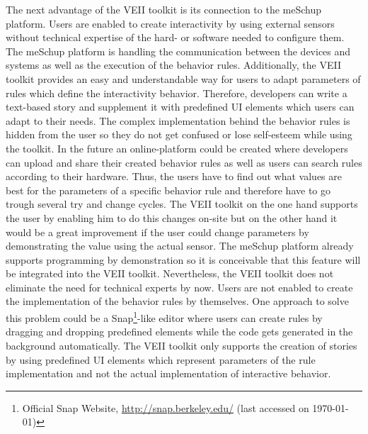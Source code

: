 The next advantage of the VEII toolkit is its connection to the meSchup platform. Users are enabled to create interactivity by using external sensors without technical expertise of the hard- or software needed to configure them. The meSchup platform is handling the communication between the devices and systems as well as the execution of the behavior rules. Additionally, the VEII toolkit provides an easy and understandable way for users to adapt parameters of rules which define the interactivity behavior. Therefore, developers can write a text-based story and supplement it with predefined UI elements which users can adapt to their needs. The complex implementation behind the behavior rules is hidden from the user so they do not get confused or lose self-esteem while using the toolkit. In the future an online-platform could be created where developers can upload and share their created behavior rules as well as users can search rules according to their hardware. Thus, the users have to find out what values are best for the parameters of a specific behavior rule and therefore have to go trough several try and change cycles. The VEII toolkit on the one hand supports the user by enabling him to do this changes on-site but on the other hand it would be a great improvement if the user could change parameters by demonstrating the value using the actual sensor. The meSchup platform already supports programming by demonstration so it is conceivable that this feature will be integrated into the VEII toolkit. Nevertheless, the VEII toolkit does not eliminate the need for technical experts by now. Users are not enabled to create the implementation of the behavior rules by themselves. One approach to solve this problem could be a Snap\footnote{Official Snap Website, \url{http://snap.berkeley.edu/} (last accessed on \today)}-like editor where users can create rules by dragging and dropping predefined elements while the code gets generated in the background automatically. The VEII toolkit only supports the creation of stories by using predefined UI elements which represent parameters of the rule implementation and not the actual implementation of interactive behavior.
 

